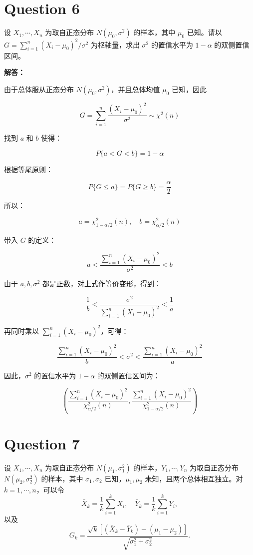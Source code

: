 \documentclass[12pt,a4paper]{article}
\begin{document}
\section{Question 6}

设 $X_1,\cdots,X_n$ 为取自正态分布 $N(\mu_0,\sigma^2)$ 的样本，其中 $\mu_0$ 已知。请以 $G = \sum_{i=1}^{n}(X_i-\mu_0)^2/\sigma^2$ 为枢轴量，求出 $\sigma^2$ 的置信水平为 $1-\alpha$ 的双侧置信区间。

\begin{answerbox}
\textbf{解答：}

由于总体服从正态分布 $N(\mu_0,\sigma^2)$，并且总体均值 $\mu_0$ 已知，因此

$$
G = \sum_{i=1}^{n}\frac{(X_i-\mu_0)^2}{\sigma^2} \sim \chi^2(n)
$$

找到 $a$ 和 $b$ 使得：

$$
P\{a < G < b\} = 1- \alpha
$$

根据等尾原则：

$$
P\{G\le a\}=P\{G\ge b\}=\frac{\alpha}{2}
$$

所以：

$$
a = \chi^2_{1-\alpha/2}(n), \quad b = \chi^2_{\alpha/2}(n)
$$

带入 $G$ 的定义：

$$
a < \frac{\sum_{i=1}^{n}(X_i-\mu_0)^2}{\sigma^2} < b
$$

由于 $a,b,\sigma^2$ 都是正数，对上式作等价变形，得到：

$$
\frac{1}{b}
<
\frac{\sigma^2}{\sum_{i=1}^{n}(X_i-\mu_0)^2}
<
\frac{1}{a}
$$

再同时乘以 $\sum_{i=1}^{n}(X_i-\mu_0)^2$，可得：

$$
\frac{\sum_{i=1}^{n}(X_i-\mu_0)^2}{b}
<
\sigma^2
<
\frac{\sum_{i=1}^{n}(X_i-\mu_0)^2}{a}
$$

因此，$\sigma^2$ 的置信水平为 $1-\alpha$ 的双侧置信区间为：

$$
\left(\frac{\sum_{i=1}^{n}(X_i-\mu_0)^2}{\chi^2_{\alpha/2}(n)}, \frac{\sum_{i=1}^{n}(X_i-\mu_0)^2}{\chi^2_{1-\alpha/2}(n)}\right)
$$
\end{answerbox}

\section{Question 7}

设 $X_1,\cdots,X_n$ 为取自正态分布 $N(\mu_1,\sigma_1^2)$ 的样本，$Y_1,\cdots,Y_n$ 为取自正态分布 $N(\mu_2,\sigma_2^2)$ 的样本，其中 $\sigma_1,\sigma_2$ 已知，$\mu_1,\mu_2$ 未知，且两个总体相互独立。对 $k=1,\cdots,n$，可以令
\[
\bar{X}_k = \frac{1}{k}\sum_{i=1}^{k}X_i, \quad \bar{Y}_k = \frac{1}{k}\sum_{i=1}^{k}Y_i,
\]
以及
\[
G_k = \frac{\sqrt{k}\left[(\bar{X}_k-\bar{Y}_k)-(\mu_1-\mu_2)\right]}{\sqrt{\sigma_1^2+\sigma_2^2}}.
\]
\end{document}
